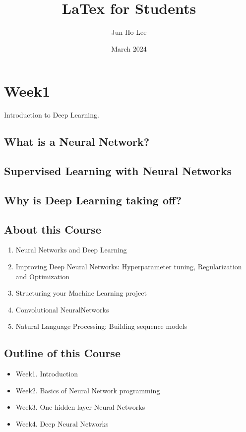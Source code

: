 \documentclass{article}
\title{LaTex for Students}
\author{Jun Ho Lee}
\date{March 2024}
\begin{document}
\newpage

\section{Week1}

Introduction to Deep Learning.

\subsection{What is a Neural Network?}

\subsection{Supervised Learning with Neural Networks}

\subsection{Why is Deep Learning taking off?}

\subsection{About this Course}
    \begin{enumerate}
        \item Neural Networks and Deep Learning
        \item Improving Deep Neural Networks: Hyperparameter  tuning, Regularization and Optimization
        \item Structuring your Machine Learning project
        \item Convolutional NeuralNetworks
        \item Natural Language Processing: Building sequence models
    \end{enumerate}

\subsection{Outline of this Course}
    \begin{itemize}
        \item{Week1. Introduction}
        \item{Week2. Basics of Neural Network programming}
        \item{Week3. One hidden layer Neural Networks}
        \item{Week4. Deep Neural Networks}
    \end{itemize}
\end{document}
